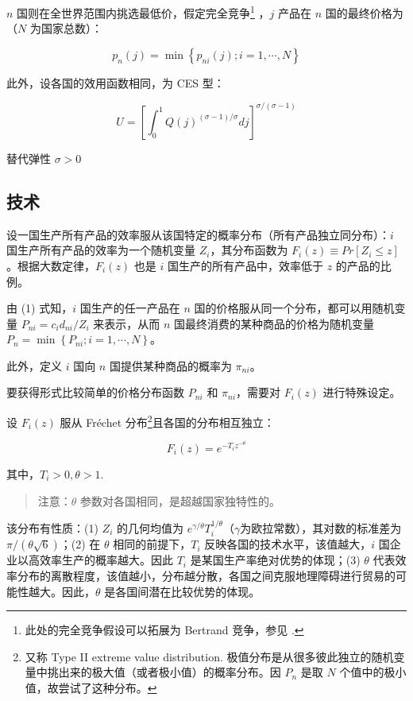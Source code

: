 \documentclass[
]{article}
\begin{document}
\(n\) 国则在全世界范围内挑选最低价，假定完全竞争\footnote{此处的完全竞争假设可以拓展为 Bertrand 竞争，参见 \citet{2003Plants}.} ，\(j\) 产品在 \(n\)
国的最终价格为（\(N\) 为国家总数）：

\[
p_{n}(j)=\min \left\{p_{n i}(j) ; i=1, \cdots, N\right\} \tag{2}
\]

此外，设各国的效用函数相同，为 CES 型：

\[
U=\left[\int_{0}^{1} Q(j)^{(\sigma-1) / \sigma} d j\right]^{\sigma /(\sigma-1)} \tag{3}
\]

替代弹性 \(\sigma>0\)

\hypertarget{ux6280ux672f}{%
\subsection{技术}\label{ux6280ux672f}}

设一国生产所有产品的效率服从该国特定的概率分布（所有产品独立同分布）：\(i\)
国生产所有产品的效率为一个随机变量 \(Z_i\)，其分布函数为
\(F_i(z) \equiv Pr[Z_i \le z]\)。根据大数定律，\(F_i(z)\) 也是 \(i\)
国生产的所有产品中，效率低于 \(z\) 的产品的比例。

由 (1) 式知，\(i\) 国生产的任一产品在 \(n\) 国的价格服从同一个分布，都可以用随机变量 \(P_{n i}=c_{i} d_{n i} / Z_{i}\) 来表示，从而 \(n\) 国最终消费的某种商品的价格为随机变量
\(P_{n}=\min \left\{P_{n i} ; i=1, \cdots, N\right\}\)。

此外，定义 \(i\) 国向 \(n\) 国提供某种商品的概率为 \(\pi_{n i}\)。

要获得形式比较简单的价格分布函数 \(P_{ni}\) 和 \(\pi_{n i}\)，需要对 \(F_i(z)\) 进行特殊设定。

设 \(F_i(z)\) 服从 Fréchet 分布\footnote{又称 Type II extreme value distribution. 极值分布是从很多彼此独立的随机变量中挑出来的极大值（或者极小值）的概率分布。因 \(P_n\) 是取 \(N\) 个值中的极小值，故尝试了这种分布。}且各国的分布相互独立：

\[
F_{i}(z)=e^{-T_{i} z^{-\theta}} \tag{4}
\]

其中，\(T_i>0, \theta >1\).

\begin{quote}
注意：\(\theta\) 参数对各国相同，是超越国家独特性的。
\end{quote}

该分布有性质：(1) \(Z_i\) 的几何均值为
\(e^{\gamma/\theta}T_i^{1/\theta}\)（\(\gamma\)为欧拉常数），其对数的标准差为
\(\pi/(\theta \sqrt{6})\)；(2) 在 \(\theta\) 相同的前提下，\(T_i\)
反映各国的技术水平，该值越大，\(i\) 国企业以高效率生产的概率越大。因此 \(T_i\)
是某国生产率绝对优势的体现；(3) \(\theta\)
代表效率分布的离散程度，该值越小，分布越分散，各国之间克服地理障碍进行贸易的可能性越大。因此，\(\theta\)
是各国间潜在比较优势的体现。
\end{document}

